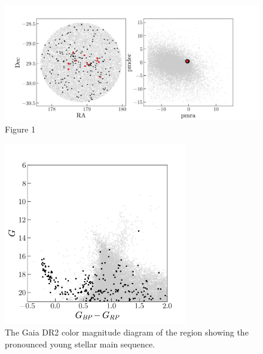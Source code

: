\documentclass[modern]{aastex62}
\newcommand{\vlsr}{$V_{\rm LSR}~$}
\newcommand{\hi}{H{\footnotesize I} }
\begin{document}



\begin{figure}
\centering
\includegraphics[width=12cm]{sky_pm.png}
\caption{Figure 1}
\label{fig_skypm}
\end{figure}

\begin{figure}
\centering
\includegraphics[width=8cm]{cmd.png}
\caption{The Gaia DR2 color magnitude diagram of the region showing the pronounced
young stellar main sequence.}
\label{fig_cmd}
\end{figure}
\end{document}

